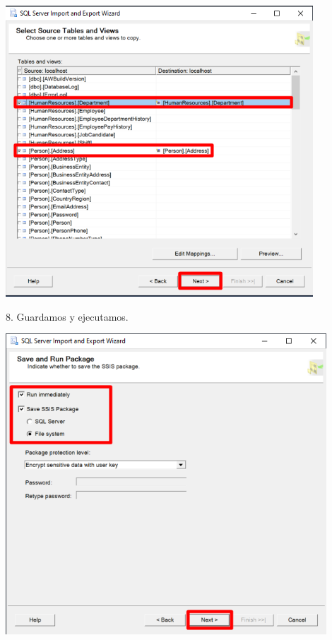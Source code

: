 \documentclass[12pt,letterpaper]{article}
\begin{document}
	\begin{center}
	\includegraphics[width=11.5cm]{./img/7}
	\end{center}	
8. Guardamos y ejecutamos.
	\begin{center}
	\includegraphics[width=12cm]{./img/8}
	\end{center}	
\end{document}
